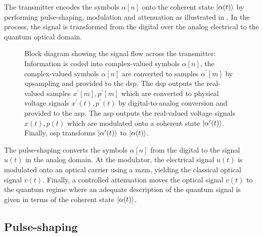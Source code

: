                                                                                                                                                                                                                                                                                                                                                                                                                                                                                                                                                                                                                                                                                                                      

The transmitter encodes the symbols $\alpha[n]$ onto the coherent state $\ket{\alpha(t)}$ by performing pulse-shaping, modulation and attenuation as illustrated in .
In the process, the signal is transformed from the digital over the analog electrical to the quantum optical domain.
\begin{figure}[htb]
	\centering
	
	\caption{Block diagram showing the signal flow across the transmitter: Information is coded into complex-valued symbols $\alpha[n]$, the complex-valued symbols $\alpha[n]$ are converted to samples $\alpha^\prime[m]$ by upsampling and provided to the \gls{dsp}. The \gls{dsp} outputs the real-valued samples $x^\prime[m],p^\prime[m]$ which are converted to physical voltage signals $x^\prime(t),p^\prime(t)$ by digital-to-analog conversion and provided to the \gls{asp}. The \gls{asp} outputs the real-valued voltage signals $x(t),p(t)$ which are modulated onto a coherent state $\ket{\alpha^\prime(t)}$. Finally, \gls{osp} transforms $\ket{\alpha^\prime(t)}$ to $\ket{\alpha(t)}$.}\label{fig:transmitter}
\end{figure}
The pulse-shaping converts the symbols $\alpha[n]$ from the digital to the signal $u(t)$ in the analog domain.
At the modulator, the electrical signal $u(t)$ is modulated onto an optical carrier using a \gls{mzm}, yielding the classical optical signal $v(t)$.
Finally, a controlled attenuation moves the optical signal $v(t)$ to the quantum regime where an adequate description of the quantum signal is given in terms of the coherent state $\ket{\alpha(t)}$.

\subsection{Pulse-shaping}

